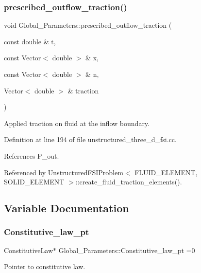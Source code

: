 \subsubsection{\texorpdfstring{prescribed\+\_\+outflow\+\_\+traction()}{prescribed\_outflow\_traction()}}
{\footnotesize\ttfamily void Global\+\_\+\+Parameters\+::prescribed\+\_\+outflow\+\_\+traction (\begin{DoxyParamCaption}\item[{const double \&}]{t,  }\item[{const Vector$<$ double $>$ \&}]{x,  }\item[{const Vector$<$ double $>$ \&}]{n,  }\item[{Vector$<$ double $>$ \&}]{traction }\end{DoxyParamCaption})}



Applied traction on fluid at the inflow boundary. 



Definition at line 194 of file unstructured\+\_\+three\+\_\+d\+\_\+fsi.\+cc.



References P\+\_\+out.



Referenced by Unstructured\+F\+S\+I\+Problem$<$ F\+L\+U\+I\+D\+\_\+\+E\+L\+E\+M\+E\+N\+T, S\+O\+L\+I\+D\+\_\+\+E\+L\+E\+M\+E\+N\+T $>$\+::create\+\_\+fluid\+\_\+traction\+\_\+elements().



\subsection{Variable Documentation}
\mbox{\label{namespaceGlobal__Parameters_adbd1f040f375c96fe56b3f475f7dbec2}} 
\subsubsection{\texorpdfstring{Constitutive\+\_\+law\+\_\+pt}{Constitutive\_law\_pt}}
{\footnotesize\ttfamily Constitutive\+Law$\ast$ Global\+\_\+\+Parameters\+::\+Constitutive\+\_\+law\+\_\+pt =0}



Pointer to constitutive law. 



